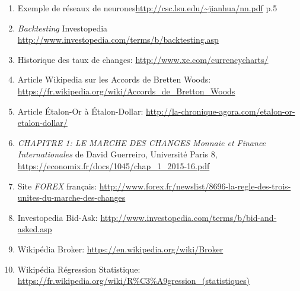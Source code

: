 \documentclass[a4paper, 11pt]{article}
\begin{document}
\begin{enumerate}
\item Exemple de réseaux de neurones\url{http://csc.lsu.edu/~jianhua/nn.pdf} p.5
\item \textit{Backtesting} Investopedia \url{http://www.investopedia.com/terms/b/backtesting.asp} \label{backtesting investopedia}
\item Historique des taux de changes: \url{http://www.xe.com/currencycharts/} \label{historique taux de change}
\item Article Wikipedia sur les Accords de Bretten Woods: \url{https://fr.wikipedia.org/wiki/Accords_de_Bretton_Woods} \label{wikipedia bretten woods}
\item Article Étalon-Or à Étalon-Dollar: \url{http://la-chronique-agora.com/etalon-or-etalon-dollar/} \label{étalon-or à étalon-dollar}
\item \textit{CHAPITRE 1: LE MARCHE DES CHANGES Monnaie et Finance Internationales} de David Guerreiro, Université Paris 8, \url{https://economix.fr/docs/1045/chap_1_2015-16.pdf} \label{marche des changes}
\item Site \textit{FOREX} français: \url{http://www.forex.fr/newslist/8696-la-regle-des-trois-unites-du-marche-des-changes} \label{site fr forex}
\item Investopedia Bid-Ask: \url{http://www.investopedia.com/terms/b/bid-and-asked.asp} \label{investopedia bid ask}
\item Wikipédia Broker: \url{https://en.wikipedia.org/wiki/Broker} \label{wikipedia broker}
\item Wikipédia Régression Statistique: \url{https://fr.wikipedia.org/wiki/R\%C3\%A9gression_(statistiques)} \label{wikipedia régression}
\end{enumerate}
\end{document}
